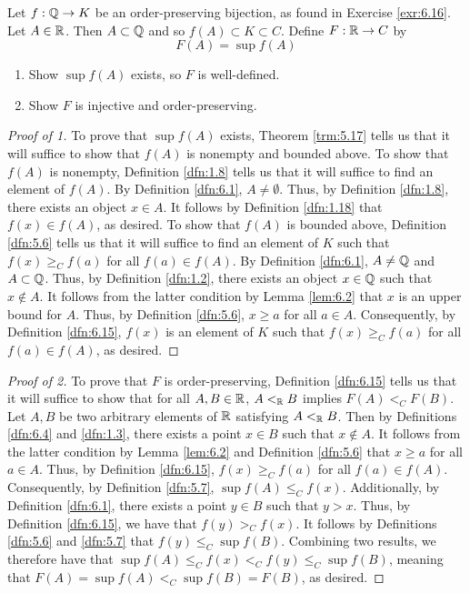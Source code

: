 \documentclass[../main.tex]{subfiles}
\begin{document}
\begin{exercise}\label{exr:6.17}
    Let $f:\mathbb{Q}\to K$ be an order-preserving bijection, as found in Exercise \ref{exr:6.16}. Let $A\in\mathbb{R}$. Then $A\subset\mathbb{Q}$ and so $f(A)\subset K\subset C$. Define $F:\mathbb{R}\to C$ by
    \begin{equation*}
        F(A)=\sup f(A)
    \end{equation*}
    \begin{enumerate}
        \item Show $\sup f(A)$ exists, so $F$ is well-defined.
        \item Show $F$ is injective and order-preserving.
    \end{enumerate}
    \begin{proof}[Proof of 1]
        To prove that $\sup f(A)$ exists, Theorem \ref{trm:5.17} tells us that it will suffice to show that $f(A)$ is nonempty and bounded above. To show that $f(A)$ is nonempty, Definition \ref{dfn:1.8} tells us that it will suffice to find an element of $f(A)$. By Definition \ref{dfn:6.1}, $A\neq\emptyset$. Thus, by Definition \ref{dfn:1.8}, there exists an object $x\in A$. It follows by Definition \ref{dfn:1.18} that $f(x)\in f(A)$, as desired. To show that $f(A)$ is bounded above, Definition \ref{dfn:5.6} tells us that it will suffice to find an element of $K$ such that $f(x)\geq_Cf(a)$ for all $f(a)\in f(A)$. By Definition \ref{dfn:6.1}, $A\neq\mathbb{Q}$ and $A\subset\mathbb{Q}$. Thus, by Definition \ref{dfn:1.2}, there exists an object $x\in\mathbb{Q}$ such that $x\notin A$. It follows from the latter condition by Lemma \ref{lem:6.2} that $x$ is an upper bound for $A$. Thus, by Definition \ref{dfn:5.6}, $x\geq a$ for all $a\in A$. Consequently, by Definition \ref{dfn:6.15}, $f(x)$ is an element of $K$ such that $f(x)\geq_Cf(a)$ for all $f(a)\in f(A)$, as desired.
    \end{proof}
    \begin{proof}[Proof of 2]
        To prove that $F$ is order-preserving, Definition \ref{dfn:6.15} tells us that it will suffice to show that for all $A,B\in\mathbb{R}$, $A<_{\mathbb{R}} B$ implies $F(A)<_CF(B)$. Let $A,B$ be two arbitrary elements of $\mathbb{R}$ satisfying $A<_{\mathbb{R}} B$. Then by Definitions \ref{dfn:6.4} and \ref{dfn:1.3}, there exists a point $x\in B$ such that $x\notin A$. It follows from the latter condition by Lemma \ref{lem:6.2} and Definition \ref{dfn:5.6} that $x\geq a$ for all $a\in A$. Thus, by Definition \ref{dfn:6.15}, $f(x)\geq_Cf(a)$ for all $f(a)\in f(A)$. Consequently, by Definition \ref{dfn:5.7}, $\sup f(A)\leq_Cf(x)$. Additionally, by Definition \ref{dfn:6.1}, there exists a point $y\in B$ such that $y>x$. Thus, by Definition \ref{dfn:6.15}, we have that $f(y)>_Cf(x)$. It follows by Definitions \ref{dfn:5.6} and \ref{dfn:5.7} that $f(y)\leq_C\sup f(B)$. Combining two results, we therefore have that $\sup f(A)\leq_C f(x)<_Cf(y)\leq_C\sup f(B)$, meaning that $F(A)=\sup f(A)<_C\sup f(B)=F(B)$, as desired.\par

\end{proof}
\end{exercise}
\end{document}
